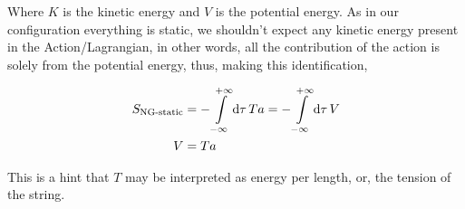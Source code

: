 Where $K$ is the kinetic energy and $V$ is the potential energy. As in our configuration everything is static, we shouldn't expect any kinetic energy present in the Action/Lagrangian, in other words, all the contribution of the action is solely from 
the potential energy, thus, making this identification,

\begin{align*}
    S_{\textnormal{NG-static}}&=-\int\limits_{-\infty}^{+\infty}\dd{\tau}Ta=-\int\limits_{-\infty}^{+\infty}\dd{\tau}V\\
    V&=Ta
\end{align*}

This is a hint that $T$ may be interpreted as energy per length, or, the tension of the string.